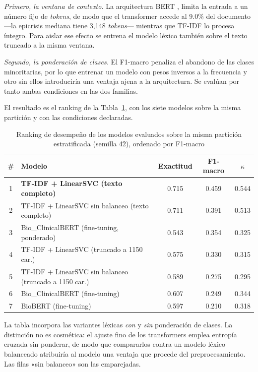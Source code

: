 \documentclass[conference]{IEEEtran}
\begin{document}
\emph{Primero, la ventana de contexto.} La arquitectura BERT \cite{bert},
\cite{vaswani} limita la entrada a un número fijo de \emph{tokens}, de modo
que el transformer accede al 9.0\% del documento ---la
epicrisis mediana tiene 3,148 \emph{tokens}--- mientras que
TF-IDF lo procesa íntegro. Para aislar ese efecto se entrena el modelo léxico
también sobre el texto truncado a la misma ventana.

\emph{Segundo, la ponderación de clases.} El F1-macro penaliza el abandono de
las clases minoritarias, por lo que entrenar un modelo con pesos inversos a la
frecuencia y otro sin ellos introduciría una ventaja ajena a la arquitectura.
Se evalúan por tanto ambas condiciones en las dos familias.

El resultado es el ranking de la Tabla~\ref{tab:modelos}, con los siete
modelos sobre la misma partición y con las condiciones declaradas.

\begin{table}[htbp]
\caption{Ranking de desempeño de los modelos evaluados sobre la misma
partición estratificada (semilla 42), ordenado por F1-macro}
\label{tab:modelos}
\centering
\footnotesize
\begin{tabular}{@{}clccc@{}}
\toprule
\textbf{\#} & \textbf{Modelo} & \textbf{Exactitud} & \textbf{F1-macro} & \textbf{$\kappa$} \\
\midrule
1 & \textbf{TF-IDF + LinearSVC (texto completo)} & 0.715 & 0.459 & 0.544 \\
2 & \textrm{TF-IDF + LinearSVC sin balanceo (texto completo)} & 0.711 & 0.391 & 0.513 \\
3 & \textrm{Bio\_ClinicalBERT (fine-tuning, ponderado)} & 0.543 & 0.354 & 0.325 \\
4 & \textrm{TF-IDF + LinearSVC (truncado a 1150 car.)} & 0.575 & 0.330 & 0.315 \\
5 & \textrm{TF-IDF + LinearSVC sin balanceo (truncado a 1150 car.)} & 0.589 & 0.275 & 0.295 \\
6 & \textrm{Bio\_ClinicalBERT (fine-tuning)} & 0.607 & 0.249 & 0.344 \\
7 & \textrm{BioBERT (fine-tuning)} & 0.597 & 0.210 & 0.318 \\
\bottomrule
\end{tabular}
\end{table}

La tabla incorpora las variantes léxicas \emph{con} y \emph{sin} ponderación
de clases. La distinción no es cosmética: el ajuste fino de los transformers
emplea entropía cruzada sin ponderar, de modo que compararlos contra un modelo
léxico balanceado atribuiría al modelo una ventaja que procede del
preprocesamiento. Las filas «sin balanceo» son las emparejadas.
\end{document}
